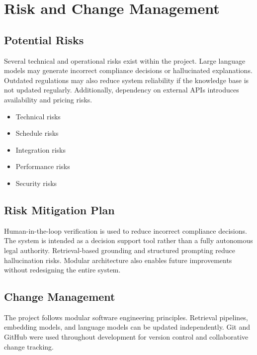\documentclass[a4paper,12pt]{article}
\begin{document}
\section{Risk and Change Management}

\subsection{Potential Risks}

\hspace{0.5cm} Several technical and operational risks exist within the project. Large language models may generate incorrect compliance decisions or hallucinated explanations. Outdated regulations may also reduce system reliability if the knowledge base is not updated regularly. Additionally, dependency on external APIs introduces availability and pricing risks.

\begin{itemize}[leftmargin=1.2cm]
    \item Technical risks
    \item Schedule risks
    \item Integration risks
    \item Performance risks
    \item Security risks
\end{itemize}

\subsection{Risk Mitigation Plan}

\hspace{0.5cm} Human-in-the-loop verification is used to reduce incorrect compliance decisions. The system is intended as a decision support tool rather than a fully autonomous legal authority. Retrieval-based grounding and structured prompting reduce hallucination risks. Modular architecture also enables future improvements without redesigning the entire system.

\subsection{Change Management}

\hspace{0.5cm} The project follows modular software engineering principles. Retrieval pipelines, embedding models, and language models can be updated independently. Git and GitHub were used throughout development for version control and collaborative change tracking.
\end{document}
